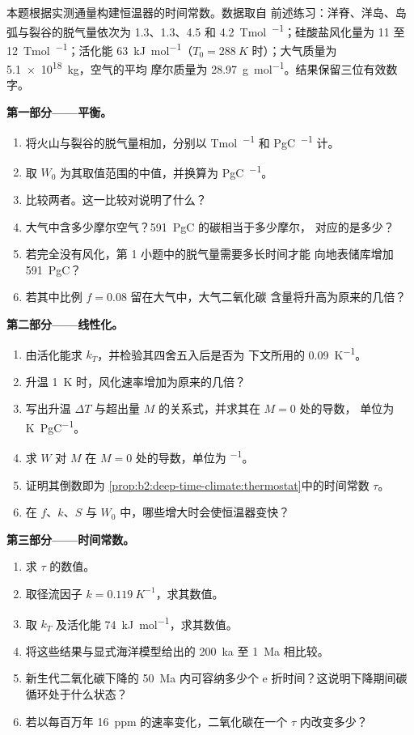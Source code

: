 \begin{problem}\label{pb:b2:deep-time-climate:1}
本题根据实测通量构建恒温器的时间常数。数据取自
前述练习：洋脊、洋岛、岛弧与裂谷的脱气量依次为 \num{1.3}、\num{1.3}、4.5 和
\qty{4.2}{Tmol.^{-1}}；硅酸盐风化量为 11 至 \qty{12}{Tmol.^{-1}}；活化能
\qty{63}{kJ.mol^{-1}}（$T_0 = \qty{288}{K}$ 时）；大气质量为 \qty{5.1e18}{kg}，空气的平均
摩尔质量为 \qty{28.97}{g.mol^{-1}}。结果保留三位有效数字。

\noindent\textbf{第一部分——平衡。}
\begin{enumerate}
  \item 将火山与裂谷的脱气量相加，分别以 \unit{Tmol.^{-1}} 和 \unit{PgC.^{-1}} 计。
  \item 取 $W_0$ 为其取值范围的中值，并换算为 \unit{PgC.^{-1}}。
  \item 比较两者。这一比较对说明了什么？
  \item 大气中含多少摩尔空气？\qty{591}{PgC} 的碳相当于多少摩尔，
        对应的是多少？
  \item 若完全没有风化，第 1 小题中的脱气量需要多长时间才能
        向地表储库增加 \qty{591}{PgC}？
  \item 若其中比例 $f = 0.08$ 留在大气中，大气二氧化碳
        含量将升高为原来的几倍？
\end{enumerate}

\noindent\textbf{第二部分——线性化。}
\begin{enumerate}[resume]
  \item 由活化能求 $k_T$，并检验其四舍五入后是否为
        下文所用的 \qty{0.09}{K^{-1}}。
  \item 升温 \qty{1}{K} 时，风化速率增加为原来的几倍？
  \item 写出升温 $\Delta T$ 与超出量 $M$ 的关系式，并求其在 $M = 0$ 处的导数，
        单位为 \unit{K.PgC^{-1}}。
  \item 求 $W$ 对 $M$ 在 $M = 0$ 处的导数，单位为 \unit{^{-1}}。
  \item 证明其倒数即为
        \cref{prop:b2:deep-time-climate:thermostat}中的时间常数 $\tau$。
  \item 在 $f$、$k$、$S$ 与 $W_0$ 中，哪些增大时会使恒温器变快？
\end{enumerate}

\noindent\textbf{第三部分——时间常数。}
\begin{enumerate}[resume]
  \item 求 $\tau$ 的数值。
  \item 取径流因子 $k = \qty{0.119}{K^{-1}}$，求其数值。
  \item 取 $k_T$ 及活化能 \qty{74}{kJ.mol^{-1}}，求其数值。
  \item 将这些结果与显式海洋模型给出的 \qty{200}{ka} 至 \qty{1}{Ma} 相比较。
  \item 新生代二氧化碳下降的 \qty{50}{Ma} 内可容纳多少个
        e 折时间？这说明下降期间碳循环处于什么状态？
  \item 若以每百万年 \qty{16}{ppm} 的速率变化，二氧化碳在一个 $\tau$ 内改变多少？
\end{enumerate}


\end{problem}
